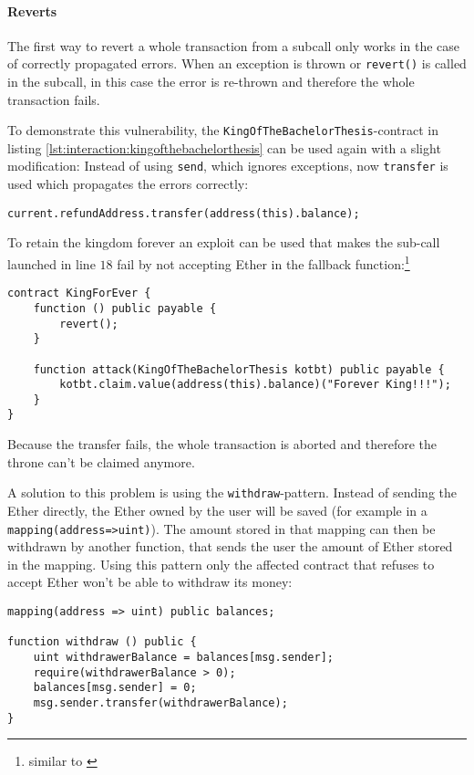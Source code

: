 \paragraph{Reverts}
The first way to revert a whole transaction from a subcall only works in the case of correctly propagated errors. When an exception is thrown or \texttt{revert()} is called in the subcall, in this case the error is re-thrown and therefore the whole transaction fails.

To demonstrate this vulnerability, the \texttt{KingOfTheBachelorThesis}-contract in listing \ref{lst:interaction:kingofthebachelorthesis} can be used again with a slight modification: Instead of using \texttt{send}, which ignores exceptions, now \texttt{transfer} is used which propagates the errors correctly:
\begin{verbatim}
current.refundAddress.transfer(address(this).balance);
\end{verbatim}

To retain the kingdom forever an exploit can be used that makes the sub-call launched in line \( 18 \) fail by not accepting Ether in the fallback function:\footnote{similar to \cite[section 4.2, second example]{atzei:attacksurvey}}
\begin{verbatim}
contract KingForEver {
    function () public payable {
        revert();
    }
    
    function attack(KingOfTheBachelorThesis kotbt) public payable {
        kotbt.claim.value(address(this).balance)("Forever King!!!");
    }
}
\end{verbatim}

Because the transfer fails, the whole transaction is aborted and therefore the throne can't be claimed anymore.

A solution to this problem is using the \texttt{withdraw}-pattern. Instead of sending the Ether directly, the Ether owned by the user will be saved (for example in a \texttt{mapping(address=>uint)}). The amount stored in that mapping can then be withdrawn by another function, that sends the user the amount of Ether stored in the mapping. Using this pattern only the affected contract that refuses to accept Ether won't be able to withdraw its money:
\begin{verbatim}
mapping(address => uint) public balances;

function withdraw () public {
    uint withdrawerBalance = balances[msg.sender];
    require(withdrawerBalance > 0);
    balances[msg.sender] = 0;
    msg.sender.transfer(withdrawerBalance);
}
\end{verbatim}

